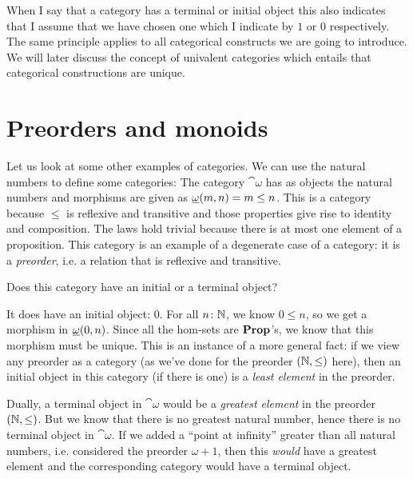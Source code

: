 When I say that a category has a terminal or initial object this also indicates that I assume that we have chosen one which I indicate by $1$ or $0$ respectively. The same principle applies to all categorical constructs we are going to introduce. We will later discuss the concept of univalent categories which entails that categorical constructions are unique.

\section{Preorders and monoids}
\label{sec:preorders-mnoids}

Let us look at some other examples of categories. We can use the natural numbers to define some categories: The category $\cat{\omega}$ has as objects the natural numbers and morphisms are given as $\underline{\mathbf{\omega}}(m,n) = m \leq n$. This is a category because $\leq$ is reflexive and transitive and those properties give rise to identity and composition. The laws hold trivial because there is at most one element of a proposition. This category is an example of a degenerate case of a category: it is a \emph{preorder}, i.e. a relation that is reflexive and transitive. 

\begin{Exercise}
  Does this category have an initial or a terminal object? 
\end{Exercise}
\begin{Answer}
  It does have an initial object: 0. For all $n\colon\mathbb{N}$, we know $0\leq n$, so we get a morphism in $\underline{\mathbf{\omega}}(0,n)$. Since all the hom-sets are $\mathbf{Prop}$'s, we know that this morphism must be unique. This is an instance of a more general fact: if we view any preorder as a category (as we've done for the preorder $(\mathbb{N},\leq)$ here), then an initial object in this category (if there is one) is a \emph{least element} in the preorder.

  Dually, a terminal object in $\cat{\omega}$ would be a \emph{greatest element} in the preorder $(\mathbb{N},\leq)$. But we know that there is no greatest natural number, hence there is no terminal object in $\cat{\omega}$. If we added a ``point at infinity'' greater than all natural numbers, i.e. considered the preorder $\omega+1$, then this \emph{would} have a greatest element and the corresponding category would have a terminal object. 
\end{Answer}


